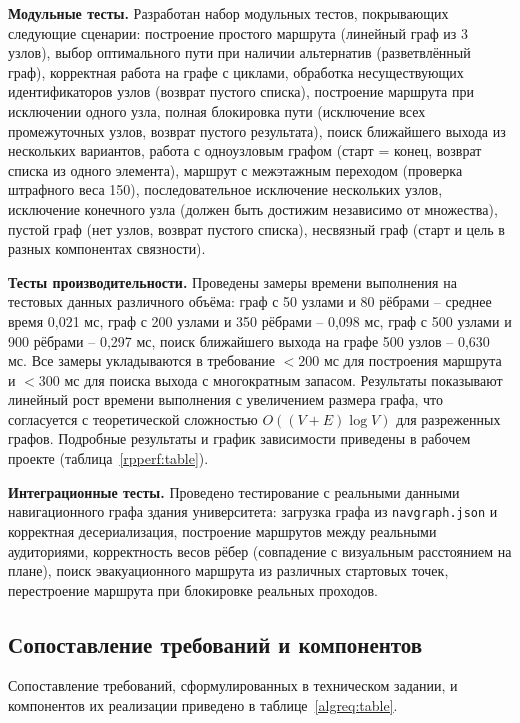 \textbf{Модульные тесты.} Разработан набор модульных тестов, покрывающих следующие сценарии: построение простого маршрута (линейный граф из 3 узлов), выбор оптимального пути при наличии альтернатив (разветвлённый граф), корректная работа на графе с циклами, обработка несуществующих идентификаторов узлов (возврат пустого списка), построение маршрута при исключении одного узла, полная блокировка пути (исключение всех промежуточных узлов, возврат пустого результата), поиск ближайшего выхода из нескольких вариантов, работа с одноузловым графом (старт = конец, возврат списка из одного элемента), маршрут с межэтажным переходом (проверка штрафного веса 150), последовательное исключение нескольких узлов, исключение конечного узла (должен быть достижим независимо от множества), пустой граф (нет узлов, возврат пустого списка), несвязный граф (старт и цель в разных компонентах связности).

\textbf{Тесты производительности.} Проведены замеры времени выполнения на тестовых данных различного объёма: граф с 50 узлами и 80 рёбрами -- среднее время 0,021 мс, граф с 200 узлами и 350 рёбрами -- 0,098 мс, граф с 500 узлами и 900 рёбрами -- 0,297 мс, поиск ближайшего выхода на графе 500 узлов -- 0,630 мс. Все замеры укладываются в требование $<200$ мс для построения маршрута и $<300$ мс для поиска выхода с многократным запасом. Результаты показывают линейный рост времени выполнения с увеличением размера графа, что согласуется с теоретической сложностью $O((V + E) \log V)$ для разреженных графов. Подробные результаты и график зависимости приведены в рабочем проекте (таблица~\ref{rpperf:table}).

\textbf{Интеграционные тесты.} Проведено тестирование с реальными данными навигационного графа здания университета: загрузка графа из \texttt{navgraph.json} и корректная десериализация, построение маршрутов между реальными аудиториями, корректность весов рёбер (совпадение с визуальным расстоянием на плане), поиск эвакуационного маршрута из различных стартовых точек, перестроение маршрута при блокировке реальных проходов.

\subsection{Сопоставление требований и компонентов}

Сопоставление требований, сформулированных в техническом задании, и компонентов их реализации приведено в таблице~\ref{algreq:table}.

